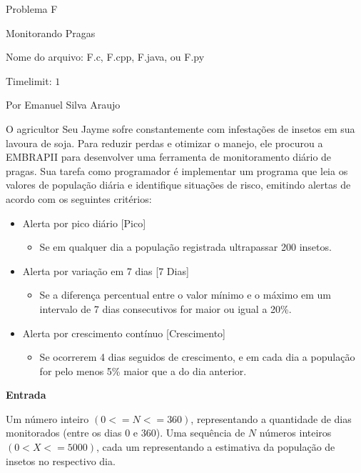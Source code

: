 \begin{center}
Problema F

Monitorando Pragas

{\small Nome do arquivo: F.c, F.cpp, F.java, ou F.py}

{\large Timelimit: $1$}

{\tiny Por Emanuel Silva Araujo}

\end{center}

\footnotesize

O agricultor Seu Jayme sofre constantemente com infestações de insetos em sua lavoura de soja. Para reduzir perdas e otimizar o manejo, ele procurou a EMBRAPII para desenvolver uma ferramenta de monitoramento diário de pragas.
Sua tarefa como programador é implementar um programa que leia os valores de população diária e identifique situações de risco, emitindo alertas de acordo com os seguintes critérios:
    \begin{itemize}
        \item  Alerta por pico diário [Pico]
        \begin{itemize}
            \item Se em qualquer dia a população registrada ultrapassar 200 insetos.
        \end{itemize}
        \item  Alerta por variação em 7 dias [7 Dias]
        \begin{itemize}
            \item Se a diferença percentual entre o valor mínimo e o máximo em um intervalo de 7 dias consecutivos for maior ou igual a 20\%.
        \end{itemize}
        \item  Alerta por crescimento contínuo [Crescimento]
        \begin{itemize}
            \item Se ocorrerem 4 dias seguidos de crescimento, e em cada dia a população for pelo menos 5\% maior que a do dia anterior.
        \end{itemize}
    \end{itemize}
        
\vspace{0.3cm}
\textbf{Entrada}

Um número inteiro $(0 <= N <= 360)$, representando a quantidade de dias monitorados (entre os dias $0$ e $360$).
Uma sequência de $N$ números inteiros $(0 < X <= 5000)$, cada um representando a estimativa da população de insetos no respectivo dia.

